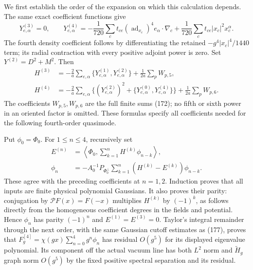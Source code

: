\documentclass[11pt]{article}
\begin{document}
We first establish the order of the expansion on which this calculation
depends. The same exact coefficient functions give
\[
 Y^{(3)}_{e,\alpha}=0,\qquad
 Y^{(4)}_{e,\alpha}=
 -\frac1{720}\sum_ct_{ce}(\operatorname{ad}_{x_c})^4e_\alpha
                       \cdot\nabla_c
 +\frac1{720}\sum_ct_{ce}|x_c|^2x_c^\alpha .
\]
The fourth density coefficient follows by differentiating the retained
$-g^4|x_c|^4/1440$ term; its radial contraction with every positive
adjoint power is zero. Set $Y^{(2)}=D^2+M^2$. Then
\begin{align*}
 H^{(3)}&=-\frac2a\sum_{e,\alpha}\{Y^{(1)}_{e,\alpha},Y^{(2)}_{e,\alpha}\}
                             +\frac1{2a}\sum_pW_{p,5},\\
 H^{(4)}&=-\frac2a\sum_{e,\alpha}
       \{(Y^{(2)}_{e,\alpha})^2+
                   \{Y^{(0)}_{e,\alpha},Y^{(4)}_{e,\alpha}\}\}
                             +\frac1{2a}\sum_pW_{p,6}.
\end{align*}
The coefficients $W_{p,5},W_{p,6}$ are the full finite sums
(172); no fifth or sixth power in an oriented factor
is omitted. These formulas specify all coefficients needed for the
following fourth-order quasimode.

Put $\phi_0=\Phi_0$. For $1\le n\le4$, recursively set
\begin{align}
 E^{(n)}&=\left\langle\Phi_0,
                   \sum_{k=1}^nH^{(k)}\phi_{n-k}\right\rangle,\nonumber\\
 \phi_n&=-A_0^{-1}P_{\Phi_0^\perp}
             \sum_{k=1}^n(H^{(k)}-E^{(k)})\phi_{n-k}.
       \label{eq:vertex-fourth-quasimode}
\end{align}
These agree with the preceding coefficients at $n=1,2$.
Induction proves that all inputs are finite physical polynomial
Gaussians. It also proves their parity: conjugation by
$\mathcal P F(x)=F(-x)$ multiplies $H^{(k)}$ by $(-1)^k$,
as follows directly from the homogeneous coefficient degrees in
the fields and potential. Hence $\phi_n$ has parity $(-1)^n$
and $E^{(1)}=E^{(3)}=0$. Taylor's integral remainder through the
next order, with the same Gaussian cutoff estimates as
(177), proves that
$F_g^{[4]}=\chi(gx)\sum_{n=0}^4g^n\phi_n$ has residual $O(g^5)$
for its displayed eigenvalue polynomial. Its component off the actual
vacuum line has both $L^2$ norm and $\widetilde H_g$ graph norm
$O(g^5)$ by the fixed positive spectral separation and its residual.
\end{document}
